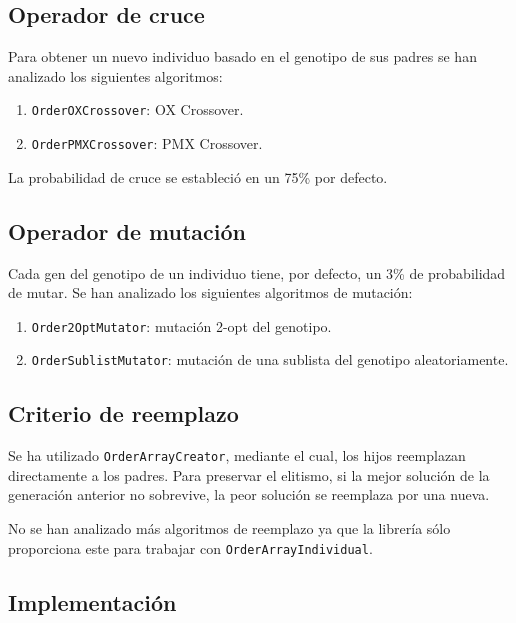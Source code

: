 \documentclass[a4paper,12pt,titlepage]{article}
\begin{document}
\subsection{Operador de cruce}

Para obtener un nuevo individuo basado en el genotipo de sus padres se han analizado los siguientes algoritmos:

\begin{enumerate}[noitemsep]
	\item \lstinline|OrderOXCrossover|: OX Crossover. 
	\item \lstinline|OrderPMXCrossover|: PMX Crossover.
\end{enumerate}

La probabilidad de cruce se estableció en un 75\% por defecto.

\subsection{Operador de mutación}

Cada gen del genotipo de un individuo tiene, por defecto, un 3\% de probabilidad de mutar. Se han analizado los siguientes algoritmos de mutación:

\begin{enumerate}[noitemsep]
	\item \lstinline|Order2OptMutator|: mutación 2-opt del genotipo.
	\item \lstinline|OrderSublistMutator|: mutación de una sublista del genotipo aleatoriamente.
\end{enumerate}

\subsection{Criterio de reemplazo}

Se ha utilizado \lstinline|OrderArrayCreator|, mediante el cual, los hijos reemplazan directamente a los padres. Para preservar el elitismo, si la mejor solución de la generación anterior no sobrevive, la peor solución se reemplaza por una nueva.

No se han analizado más algoritmos de reemplazo ya que la librería sólo proporciona este para trabajar con \lstinline|OrderArrayIndividual|.

\subsection{Implementación}
\end{document}
